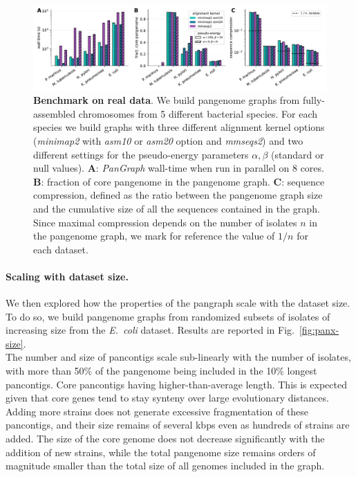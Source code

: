 \documentclass[aps,rmp,preprint,superscriptaddress,10pt,linenumbers]{revtex4-1}
\begin{document}
\begin{figure}[htb]
    \includegraphics[width=\textwidth]{figs/panx_benchmark.pdf}
    \caption{{\bf Benchmark on real data}.
        We build pangenome graphs from fully-assembled chromosomes from 5 different bacterial species. For each species we build graphs with three different alignment kernel options (\textit{minimap2} with \textit{asm10} or \textit{asm20} option and \textit{mmseqs2}) and two different settings for the pseudo-energy parameters $\alpha, \beta$ (standard or null values).
        \textbf{A}: \textit{PanGraph} wall-time when run in parallel on 8 cores.
        \textbf{B}: fraction of core pangenome in the pangenome graph.
        \textbf{C}: sequence compression, defined as the ratio between the pangenome graph size and the cumulative size of all the sequences contained in the graph. Since maximal compression depends on the number of isolates $n$ in the pangenome graph, we mark for reference the value of $1/n$ for each dataset.
    }
    \label{fig:panx-benchmark}
\end{figure}

\paragraph*{Scaling with dataset size.}

We then explored how the properties of the pangraph scale with the dataset size. To do so, we build pangenome graphs from randomized subsets of isolates of increasing size from the \textit{E.~coli} dataset. Results are reported in Fig.~\ref{fig:panx-size}.\\
The number and size of pancontigs scale sub-linearly with the number of isolates, with more than 50\% of the pangenome being included in the 10\% longest pancontigs. Core pancontigs having higher-than-average length. This is expected given that core genes tend to stay synteny over large evolutionary distances. Adding more strains does not generate excessive fragmentation of these pancontigs, and their size remains of several kbps even as hundreds of strains are added. The size of the core genome does not decrease significantly with the addition of new strains, while the total pangenome size remains orders of magnitude smaller than the total size of all genomes included in the graph.
\end{document}
